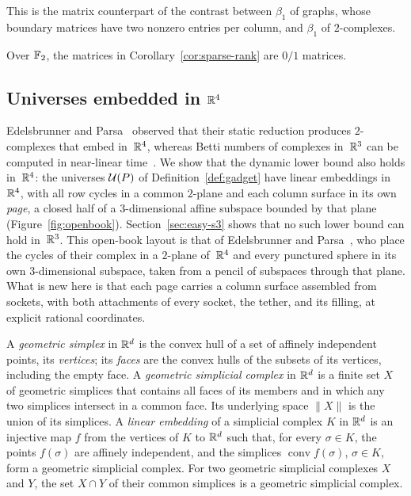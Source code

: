 This is the matrix counterpart of the contrast between $\beta_1$ of graphs, whose boundary matrices have two nonzero entries per column, and $\beta_1$ of $2$-complexes.

Over $\mathbb{F}_2$, the matrices in Corollary~\ref{cor:sparse-rank} are $0/1$ matrices.


\subsection{Universes embedded in \texorpdfstring{$\mathbb{R}^4$}{R4}}\label{sec:lower-r4}\label{sec:easy-r4}

Edelsbrunner and Parsa~\cite{EP14} observed that their static reduction produces $2$-complexes that embed in~$\mathbb{R}^4$, whereas Betti numbers of complexes in~$\mathbb{R}^3$ can be computed in near-linear time~\cite{DE95,DG98}.
We show that the dynamic lower bound also holds in~$\mathbb{R}^4$: the universes $\mathcal{U}(P)$ of Definition~\ref{def:gadget} have linear embeddings in~$\mathbb{R}^4$, with all row cycles in a common $2$-plane and each column surface in its own \emph{page}, a closed half of a $3$-dimensional affine subspace bounded by that plane (Figure~\ref{fig:openbook}).
Section~\ref{sec:easy-s3} shows that no such lower bound can hold in~$\mathbb{R}^3$.
This open-book layout is that of Edelsbrunner and Parsa~\cite[Section~3]{EP14}, who place the cycles of their complex in a $2$-plane of~$\mathbb{R}^4$ and every punctured sphere in its own $3$-dimensional subspace, taken from a pencil of subspaces through that plane.
What is new here is that each page carries a column surface assembled from sockets, with both attachments of every socket, the tether, and its filling, at explicit rational coordinates.

A \emph{geometric simplex} in $\mathbb{R}^d$ is the convex hull of a set of affinely independent points, its \emph{vertices}; its \emph{faces} are the convex hulls of the subsets of its vertices, including the empty face.
A \emph{geometric simplicial complex} in $\mathbb{R}^d$ is a finite set $X$ of geometric simplices that contains all faces of its members and in which any two simplices intersect in a common face.
Its underlying space $\lVert X\rVert$ is the union of its simplices.
A \emph{linear embedding} of a simplicial complex $K$ in $\mathbb{R}^d$ is an injective map $f$ from the vertices of $K$ to $\mathbb{R}^d$ such that, for every $\sigma\in K$, the points $f(\sigma)$ are affinely independent, and the simplices $\operatorname{conv}f(\sigma)$, $\sigma\in K$, form a geometric simplicial complex.
For two geometric simplicial complexes $X$ and $Y$, the set $X\cap Y$ of their common simplices is a geometric simplicial complex.

